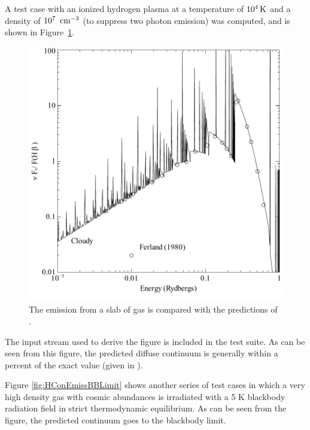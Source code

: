 A test case with an ionized hydrogen plasma at a temperature
of $10^4 {\rm\thinspace K}$ and
a density of $10^7~{\rm\thinspace cm^{-3}}$
(to suppress two photon emission) was computed, and
is shown in Figure~\ref{fig:HemisCompareFerland80}.

\begin{figure}
\centering
\includegraphics[scale=0.8]{HemisCompareFerland80}
\caption[H emission comparision]{\label{fig:HemisCompareFerland80}
The emission from a slab of gas is compared with the
predictions of \citet{Ferland1980c}.}%
\end{figure}

The input stream used to derive the figure is included in the test suite.
As can be seen from this figure, the predicted diffuse continuum is generally
within a percent of the exact value (given in \citealt{Ferland1980c}).

Figure \ref{fig:HConEmissBBLimit} shows another series of test cases in which a very high density
gas with cosmic abundances is irradiated with a 5 K blackbody radiation
field in strict thermodynamic equilibrium.  As can be seen from the figure,
the predicted continuum goes to the blackbody limit.

